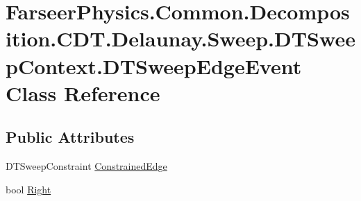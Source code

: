 \hypertarget{class_farseer_physics_1_1_common_1_1_decomposition_1_1_c_d_t_1_1_delaunay_1_1_sweep_1_1_d_t_swee7e67f8b8b0aee219026df08165b29401}{\section{Farseer\+Physics.\+Common.\+Decomposition.\+C\+D\+T.\+Delaunay.\+Sweep.\+D\+T\+Sweep\+Context.\+D\+T\+Sweep\+Edge\+Event Class Reference}
\label{class_farseer_physics_1_1_common_1_1_decomposition_1_1_c_d_t_1_1_delaunay_1_1_sweep_1_1_d_t_swee7e67f8b8b0aee219026df08165b29401}
}
\subsection*{Public Attributes}
\begin{DoxyCompactItemize}
\item 
D\+T\+Sweep\+Constraint \hyperlink{class_farseer_physics_1_1_common_1_1_decomposition_1_1_c_d_t_1_1_delaunay_1_1_sweep_1_1_d_t_swee7e67f8b8b0aee219026df08165b29401_a3d4cafafec3a5f5f928c504cc026db20}{Constrained\+Edge}
\item 
bool \hyperlink{class_farseer_physics_1_1_common_1_1_decomposition_1_1_c_d_t_1_1_delaunay_1_1_sweep_1_1_d_t_swee7e67f8b8b0aee219026df08165b29401_aa62c03526ba7de46a52e54e40218208f}{Right}
\end{DoxyCompactItemize}


